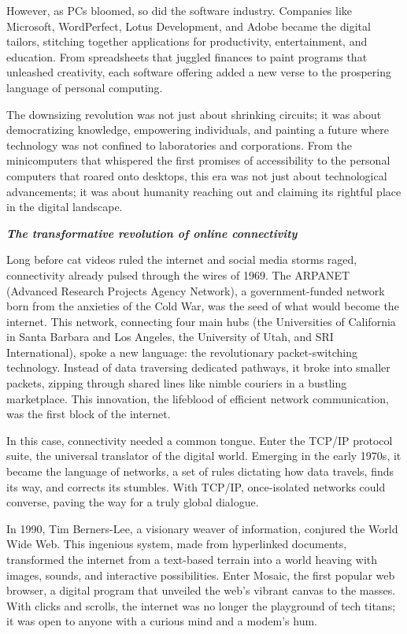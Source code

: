 \documentclass[
  letterpaper,
  DIV=11,
  numbers=noendperiod]{scrreprt}
\begin{document}
However, as PCs bloomed, so did the software industry. Companies like
Microsoft, WordPerfect, Lotus Development, and Adobe became the digital
tailors, stitching together applications for productivity,
entertainment, and education. From spreadsheets that juggled finances to
paint programs that unleashed creativity, each software offering added a
new verse to the prospering language of personal computing.

The downsizing revolution was not just about shrinking circuits; it was
about democratizing knowledge, empowering individuals, and painting a
future where technology was not confined to laboratories and
corporations. From the minicomputers that whispered the first promises
of accessibility to the personal computers that roared onto desktops,
this era was not just about technological advancements; it was about
humanity reaching out and claiming its rightful place in the digital
landscape.

\textbf{\emph{The transformative revolution of online connectivity}}

Long before cat videos ruled the internet and social media storms raged,
connectivity already pulsed through the wires of 1969. The ARPANET
(Advanced Research Projects Agency Network), a government-funded network
born from the anxieties of the Cold War, was the seed of what would
become the internet. This network, connecting four main hubs (the
Universities of California in Santa Barbara and Los Angeles, the
University of Utah, and SRI International), spoke a new language: the
revolutionary packet-switching technology. Instead of data traversing
dedicated pathways, it broke into smaller packets, zipping through
shared lines like nimble couriers in a bustling marketplace. This
innovation, the lifeblood of efficient network communication, was the
first block of the internet.

In this case, connectivity needed a common tongue. Enter the TCP/IP
protocol suite, the universal translator of the digital world. Emerging
in the early 1970s, it became the language of networks, a set of rules
dictating how data travels, finds its way, and corrects its stumbles.
With TCP/IP, once-isolated networks could converse, paving the way for a
truly global dialogue.

In 1990, Tim Berners-Lee, a visionary weaver of information, conjured
the World Wide Web. This ingenious system, made from hyperlinked
documents, transformed the internet from a text-based terrain into a
world heaving with images, sounds, and interactive possibilities. Enter
Mosaic, the first popular web browser, a digital program that unveiled
the web's vibrant canvas to the masses. With clicks and scrolls, the
internet was no longer the playground of tech titans; it was open to
anyone with a curious mind and a modem's hum.
\end{document}

